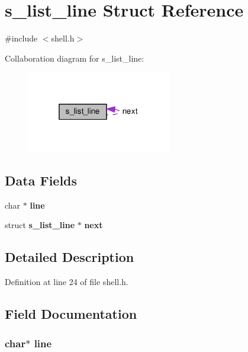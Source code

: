 \section{s\-\_\-list\-\_\-line Struct Reference}
\label{structs__list__line}


{\ttfamily \#include $<$shell.\-h$>$}



Collaboration diagram for s\-\_\-list\-\_\-line\-:\nopagebreak
\begin{figure}[H]
\begin{center}
\leavevmode
\includegraphics[width=179pt]{structs__list__line__coll__graph}
\end{center}
\end{figure}
\subsection*{Data Fields}
\begin{DoxyCompactItemize}
\item 
char $\ast$ {\bf line}
\item 
struct {\bf s\-\_\-list\-\_\-line} $\ast$ {\bf next}
\end{DoxyCompactItemize}


\subsection{Detailed Description}


Definition at line 24 of file shell.\-h.



\subsection{Field Documentation}
\subsubsection[{line}]{\setlength{\rightskip}{0pt plus 5cm}char$\ast$ line}\label{structs__list__line_a8adb30f4f6669f927fd9232f686c637b}


